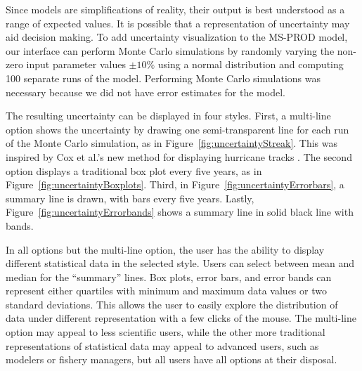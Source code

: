 Since models are simplifications of reality, their output is best understood as a range of expected values.  It is possible that a representation of uncertainty may aid decision making.  To add uncertainty visualization to the MS-PROD model, our interface can perform Monte Carlo simulations by randomly varying the non-zero input parameter values $\pm 10\%$ using a normal distribution and computing 100 separate runs of the model.  Performing Monte Carlo simulations was necessary because we did not have error estimates for the model.

The resulting uncertainty can be displayed in four styles.  First, a multi-line option shows the uncertainty by drawing one semi-transparent line for each run of the Monte Carlo simulation, as in Figure~\ref{fig:uncertaintyStreak}. This was inspired by Cox et al.'s new method for displaying hurricane tracks \citeyearpar{cox2013}.  The second option displays a traditional box plot every five years, as in Figure~\ref{fig:uncertaintyBoxplots}.  Third, in Figure~\ref{fig:uncertaintyErrorbars}, a summary line is drawn, with bars every five years.  Lastly, Figure~\ref{fig:uncertaintyErrorbands} shows a summary line in solid black line with bands.

In all options but the multi-line option, the user has the ability to display different statistical data in the selected style.  Users can select between mean and median for the ``summary'' lines.  Box plots, error bars, and error bands can represent either quartiles with minimum and maximum data values or two standard deviations.  This allows the user to easily explore the distribution of data under different representation with a few clicks of the mouse.  The multi-line option may appeal to less scientific users, while the other more traditional representations of statistical data may appeal to advanced users, such as modelers or fishery managers, but all users have all options at their disposal.

